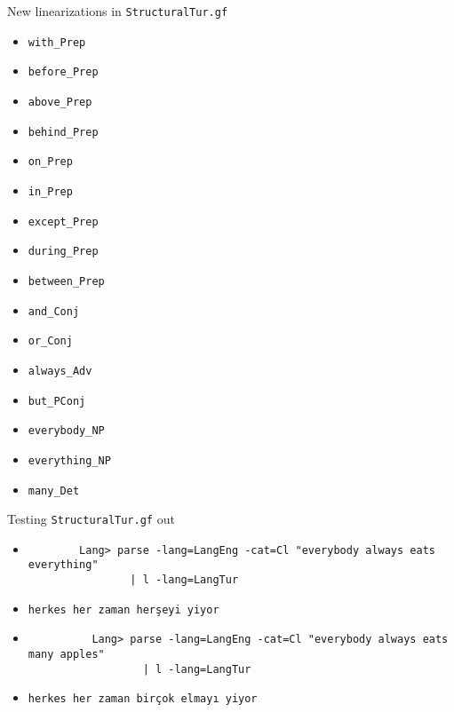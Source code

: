 \documentclass{beamer}
\newcommand{\translation}[1]{{\tiny\texttt{#1}}}
\begin{document}
  \begin{frame}{New linearizations in \texttt{StructuralTur.gf}}
    \scriptsize
    \begin{itemize}
      \item \texttt{with\_Prep}
      \item \texttt{before\_Prep}
      \item \texttt{above\_Prep}
      \item \texttt{behind\_Prep}
      \item \texttt{on\_Prep}
      \item \texttt{in\_Prep}
      \item \texttt{except\_Prep}
      \item \texttt{during\_Prep}
      \item \texttt{between\_Prep}
      \item \texttt{and\_Conj}
      \item \texttt{or\_Conj}
      \item \texttt{always\_Adv}
      \item \texttt{but\_PConj}
      \item \texttt{everybody\_NP}
      \item \texttt{everything\_NP}
      \item \texttt{many\_Det}
    \end{itemize}
    \normalsize
  \end{frame}

  \begin{frame}[fragile]{Testing \texttt{StructuralTur.gf} out}
    \begin{itemize}
      \item<1->
        \begin{lstlisting}
        Lang> parse -lang=LangEng -cat=Cl "everybody always eats everything"
                | l -lang=LangTur
        \end{lstlisting}
      \item<2->
        \begin{itemize}
          \translation{herkes her zaman her\c{s}eyi yiyor}
        \end{itemize}
      \item<3->
        \begin{lstlisting}
          Lang> parse -lang=LangEng -cat=Cl "everybody always eats many apples"
                  | l -lang=LangTur
        \end{lstlisting}
      \item<4->
        \begin{itemize}
            \translation{herkes her zaman bir\c{c}ok elmay\i\ yiyor}
        \end{itemize}
    \end{itemize}
  \end{frame}
\end{document}
